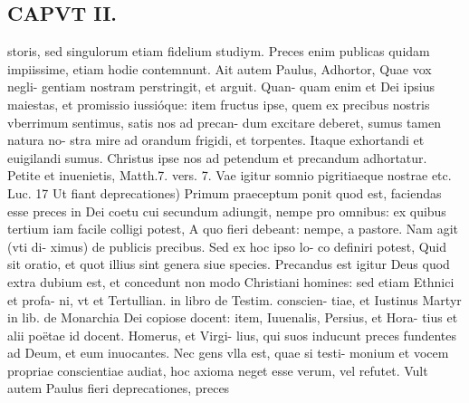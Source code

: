\documentclass{article}
\begin{document}
\begin{pages}
\section*{CAPVT  II. }
\marginpar{[ p.4I ]}\pstart storis, sed singulorum etiam fidelium studiym. Preces enim publicas quidam impiissime, etiam hodie contemnunt. Ait autem Paulus, Adhortor, Quae vox negli- gentiam nostram perstringit, et arguit. Quan- quam enim et Dei ipsius maiestas, et promissio iussióque: item fructus ipse, quem ex precibus nostris vberrimum sentimus, satis nos ad precan- dum excitare deberet, sumus tamen natura no- stra mire ad orandum frigidi, et torpentes. Itaque exhortandi et euigilandi sumus. Christus ipse nos ad petendum et precandum adhortatur. Petite et inuenietis, Matth.7. vers. 7. Vae igitur somnio pigritiaeque nostrae etc. Luc. 17 Ut fiant deprecationes) Primum praeceptum ponit quod est, faciendas esse preces in Dei coetu cui secundum adiungit, nempe pro omnibus: ex quibus tertium iam facile colligi potest, A quo fieri debeant: nempe, a pastore. Nam agit (vti di- ximus) de publicis precibus. Sed ex hoc ipso lo- co definiri potest, Quid sit oratio, et quot illius sint genera siue species. Precandus est igitur Deus quod extra dubium est, et concedunt non modo Christiani homines: sed etiam Ethnici et profa- ni, vt et Tertullian. in libro de Testim. conscien- tiae, et Iustinus Martyr in lib.  de Monarchia Dei copiose docent: item, Iuuenalis, Persius, et Hora- tius et alii poëtae id docent. Homerus, et Virgi- lius, qui suos inducunt preces fundentes ad Deum, et eum inuocantes. Nec gens vlla est, quae si testi- monium et vocem propriae conscientiae audiat, hoc axioma neget esse verum, vel refutet. Vult autem Paulus fieri deprecationes, preces  \pend

\end{pages}
\end{document}
